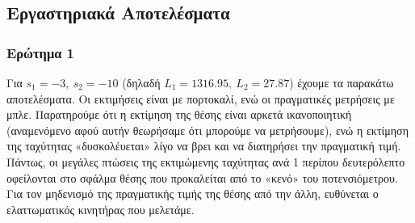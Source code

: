 \subsection{Εργαστηριακά Αποτελέσματα}
\subsubsection{Ερώτημα 1}
Για $s_1 = -3,\ s_2 = -10$ (δηλαδή $L_1 = 1316.95,\ L_2 = 27.87$) έχουμε τα παρακάτω αποτελέσματα. Οι εκτιμήσεις είναι με πορτοκαλί, ενώ οι πραγματικές μετρήσεις με μπλε. Παρατηρούμε ότι η εκτίμηση της θέσης είναι αρκετά ικανοποιητική (αναμενόμενο αφού αυτήν θεωρήσαμε ότι μπορούμε να μετρήσουμε), ενώ η εκτίμηση της ταχύτητας «δυσκολέυεται» λίγο να βρει και να διατηρήσει την πραγματική τιμή. Πάντως, οι μεγάλες πτώσεις της εκτιμώμενης ταχύτητας ανά 1 περίπου δευτερόλεπτο οφείλονται στο σφάλμα θέσης που προκαλείται από το «κενό» του ποτενσιόμετρου. Για τον μηδενισμό της πραγματικής τιμής της θέσης από την άλλη, ευθύνεται ο ελαττωματικός κινητήρας που μελετάμε.
